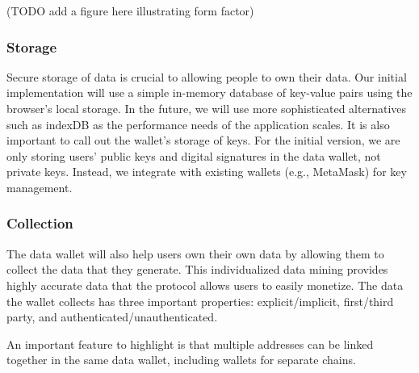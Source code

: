 (TODO add a figure here illustrating form factor)


\subsubsection{Storage}
Secure storage of data is crucial to allowing people to own their data. Our initial implementation will use a simple in-memory database of key-value pairs using the browser's local storage. In the future, we will use more sophisticated alternatives such as indexDB as the performance needs of the application scales. It is also important to call out the wallet's storage of keys. For the initial version, we are only storing users' public keys and digital signatures in the data wallet, not private keys. Instead, we integrate with existing wallets (e.g., MetaMask) for key management.


\subsubsection{Collection}
The data wallet will also help users own their own data by allowing them to collect the data that they generate. This individualized data mining provides highly accurate data that the protocol allows users to easily monetize. The data the wallet collects has three important properties: explicit/implicit, first/third party, and authenticated/unauthenticated. %

An important feature to highlight is that multiple addresses can be linked together in the same data wallet, including wallets for separate chains. %


